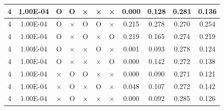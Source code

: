 \documentclass[11pt]{article}
\begin{document}
\begin{longtable}[h]{|r|r|l|l|l|l|l|r|r|l|r|}
\multicolumn{1}{|c|}{4} & \multicolumn{1}{c|}{1.00E-04} & \multicolumn{1}{c|}{O} & \multicolumn{1}{c|}{O} & \multicolumn{1}{c|}{×} & \multicolumn{1}{c|}{×} & \multicolumn{1}{c|}{×} & \multicolumn{1}{c|}{0.000} & \multicolumn{1}{c|}{0.128} & \multicolumn{1}{c|}{0.281} & \multicolumn{1}{c|}{0.136} \\ \hline
\multicolumn{1}{|c|}{4} & \multicolumn{1}{c|}{1.00E-04} & \multicolumn{1}{c|}{O} & \multicolumn{1}{c|}{×} & \multicolumn{1}{c|}{O} & \multicolumn{1}{c|}{O} & \multicolumn{1}{c|}{×} & \multicolumn{1}{c|}{0.215} & \multicolumn{1}{c|}{0.278} & \multicolumn{1}{c|}{0.270} & \multicolumn{1}{c|}{0.254} \\ \hline
\multicolumn{1}{|c|}{4} & \multicolumn{1}{c|}{1.00E-04} & \multicolumn{1}{c|}{O} & \multicolumn{1}{c|}{×} & \multicolumn{1}{c|}{O} & \multicolumn{1}{c|}{×} & \multicolumn{1}{c|}{O} & \multicolumn{1}{c|}{0.219} & \multicolumn{1}{c|}{0.165} & \multicolumn{1}{c|}{0.274} & \multicolumn{1}{c|}{0.219} \\ \hline
\multicolumn{1}{|c|}{4} & \multicolumn{1}{c|}{1.00E-04} & \multicolumn{1}{c|}{O} & \multicolumn{1}{c|}{×} & \multicolumn{1}{c|}{×} & \multicolumn{1}{c|}{O} & \multicolumn{1}{c|}{×} & \multicolumn{1}{c|}{0.001} & \multicolumn{1}{c|}{0.093} & \multicolumn{1}{c|}{0.278} & \multicolumn{1}{c|}{0.124} \\ \hline
\multicolumn{1}{|c|}{4} & \multicolumn{1}{c|}{1.00E-04} & \multicolumn{1}{c|}{O} & \multicolumn{1}{c|}{×} & \multicolumn{1}{c|}{×} & \multicolumn{1}{c|}{×} & \multicolumn{1}{c|}{O} & \multicolumn{1}{c|}{0.000} & \multicolumn{1}{c|}{0.142} & \multicolumn{1}{c|}{0.272} & \multicolumn{1}{c|}{0.138} \\ \hline
\multicolumn{1}{|c|}{4} & \multicolumn{1}{c|}{1.00E-04} & \multicolumn{1}{c|}{×} & \multicolumn{1}{c|}{O} & \multicolumn{1}{c|}{O} & \multicolumn{1}{c|}{×} & \multicolumn{1}{c|}{×} & \multicolumn{1}{c|}{0.000} & \multicolumn{1}{c|}{0.090} & \multicolumn{1}{c|}{0.271} & \multicolumn{1}{c|}{0.121} \\ \hline
\multicolumn{1}{|c|}{4} & \multicolumn{1}{c|}{1.00E-04} & \multicolumn{1}{c|}{×} & \multicolumn{1}{c|}{O} & \multicolumn{1}{c|}{×} & \multicolumn{1}{c|}{O} & \multicolumn{1}{c|}{×} & \multicolumn{1}{c|}{0.048} & \multicolumn{1}{c|}{0.107} & \multicolumn{1}{c|}{0.272} & \multicolumn{1}{c|}{0.142} \\ \hline
\multicolumn{1}{|c|}{4} & \multicolumn{1}{c|}{1.00E-04} & \multicolumn{1}{c|}{×} & \multicolumn{1}{c|}{O} & \multicolumn{1}{c|}{×} & \multicolumn{1}{c|}{×} & \multicolumn{1}{c|}{×} & \multicolumn{1}{c|}{0.000} & \multicolumn{1}{c|}{0.092} & \multicolumn{1}{c|}{0.285} & \multicolumn{1}{c|}{0.126} \\ \hline

\end{longtable}
\end{document}
